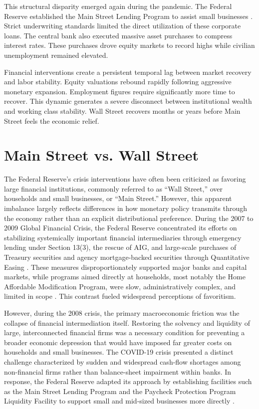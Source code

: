 \documentclass[12pt]{article}
\begin{document}
{} This structural disparity emerged again during the pandemic. The Federal Reserve established the Main Street Lending Program to assist small businesses \parencite{Sims_2020}. Strict underwriting standards limited the direct utilization of these corporate loans. The central bank also executed massive asset purchases to compress interest rates. These purchases drove equity markets to record highs while civilian unemployment remained elevated.

{} Financial interventions create a persistent temporal lag between market recovery and labor stability. Equity valuations rebound rapidly following aggressive monetary expansion. Employment figures require significantly more time to recover. This dynamic generates a severe disconnect between institutional wealth and working class stability. Wall Street recovers months or years before Main Street feels the economic relief.

\section{Main Street vs. Wall Street}
{} The Federal Reserve's crisis interventions have often been criticized as favoring large financial institutions, commonly referred to as ``Wall Street,'' over households and small businesses, or ``Main Street.'' However, this apparent imbalance largely reflects differences in how monetary policy transmits through the economy rather than an explicit distributional preference. During the 2007 to 2009 Global Financial Crisis, the Federal Reserve concentrated its efforts on stabilizing systemically important financial intermediaries through emergency lending under Section 13(3), the rescue of AIG, and large-scale purchases of Treasury securities and agency mortgage-backed securities through Quantitative Easing \parencite{Sims_2020}. These measures disproportionately supported major banks and capital markets, while programs aimed directly at households, most notably the Home Affordable Modification Program, were slow, administratively complex, and limited in scope \parencite{Agarwal_2017}. This contrast fueled widespread perceptions of favoritism.

{} However, during the 2008 crisis, the primary macroeconomic friction was the collapse of financial intermediation itself. Restoring the solvency and liquidity of large, interconnected financial firms was a necessary condition for preventing a broader economic depression that would have imposed far greater costs on households and small businesses. The COVID-19 crisis presented a distinct challenge characterized by sudden and widespread cash-flow shortages among non-financial firms rather than balance-sheet impairment within banks. In response, the Federal Reserve adapted its approach by establishing facilities such as the Main Street Lending Program and the Paycheck Protection Program Liquidity Facility to support small and mid-sized businesses more directly \parencite{Sims_2020}.
\end{document}
